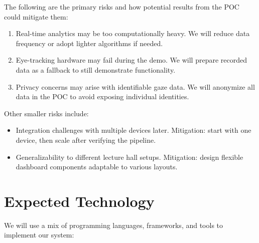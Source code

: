 \documentclass{article}
\begin{document}
\noindent
The following are the primary risks and how potential results from the POC could mitigate them:
\begin{enumerate}
  \item Real-time analytics may be too computationally heavy. We will reduce data frequency or adopt lighter algorithms if needed.
  \item Eye-tracking hardware may fail during the demo. We will prepare recorded data as a fallback to still demonstrate functionality.
  \item Privacy concerns may arise with identifiable gaze data. We will anonymize all data in the POC to avoid exposing individual identities.
\end{enumerate}

Other smaller risks include:
\begin{itemize}
  \item Integration challenges with multiple devices later. Mitigation: start with one device, then scale after verifying the pipeline.
  \item Generalizability to different lecture hall setups. Mitigation: design flexible dashboard components adaptable to various layouts.
\end{itemize}

\section{Expected Technology}

We will use a mix of programming languages, frameworks, and tools to implement
our system:
\end{document}
